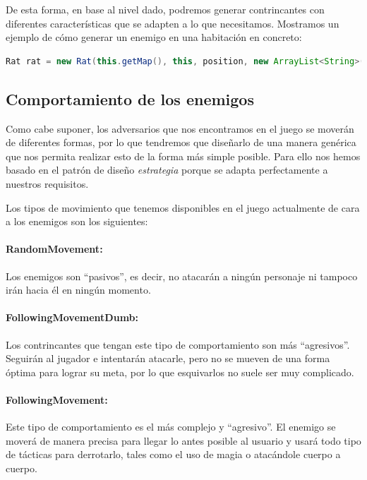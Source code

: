 De esta forma, en base al nivel dado, podremos generar contrincantes con diferentes características que se adapten a lo que necesitamos. Mostramos un ejemplo de cómo generar un enemigo en una habitación en concreto:

\begin{lstlisting}[language=java]
Rat rat = new Rat(this.getMap(), this, position, new ArrayList<String>(), level);
\end{lstlisting}

\subsection{Comportamiento de los enemigos}
\label{sec:ia}

Como cabe suponer, los adversarios que nos encontramos en el juego se moverán de diferentes formas, por lo que tendremos que diseñarlo de una manera genérica que nos permita realizar esto de la forma más simple posible.
Para ello nos hemos basado en el patrón de diseño \textit{estrategia} porque se adapta perfectamente a nuestros requisitos.

Los tipos de movimiento que tenemos disponibles en el juego actualmente de cara a los enemigos son los siguientes:

\paragraph{RandomMovement:} Los enemigos son ``pasivos'', es decir, no atacarán a ningún personaje ni tampoco irán hacia él en ningún momento.

\paragraph{FollowingMovementDumb:} Los contrincantes que tengan este tipo de comportamiento son más ``agresivos''. Seguirán al jugador e intentarán atacarle, pero no se mueven de una forma óptima para lograr su meta, por lo que esquivarlos no suele ser muy complicado.

\paragraph{FollowingMovement:} Este tipo de comportamiento es el más complejo y ``agresivo''. El enemigo se moverá de manera precisa para llegar lo antes posible al usuario y usará todo tipo de tácticas para derrotarlo, tales como el uso de magia o atacándole cuerpo a cuerpo.

